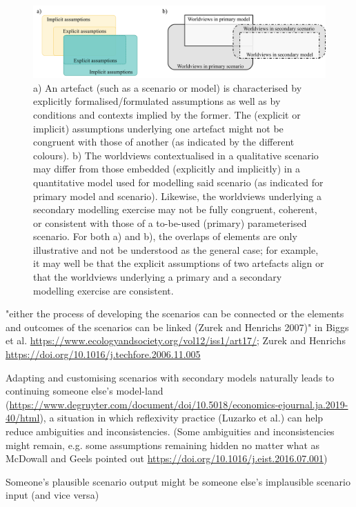 \documentclass{article}
\begin{document}
\begin{refsection}
\begin{figure} [ht]
    \includegraphics[width=\textwidth]{Worldviews.png} 
    \caption[Some caption for list of figures]{a) An artefact (such as a scenario or model) is characterised by explicitly formalised/formulated assumptions as well as by conditions and contexts implied by the former. The (explicit or implicit) assumptions underlying one artefact might not be congruent with those of another (as indicated by the different colours). b) The worldviews contextualised in a qualitative scenario may differ from those embedded (explicitly and implicitly) in a quantitative model used for modelling said scenario (as indicated for primary model and scenario). Likewise, the worldviews underlying a secondary modelling exercise may not be fully congruent, coherent, or consistent with those of a to-be-used (primary) parameterised scenario. For both a) and b), the overlaps of elements are only illustrative and not be understood as the general case; for example, it may well be that the explicit assumptions of two artefacts align or that the worldviews underlying a primary and a secondary modelling exercise are consistent.}  
    \label{fig:worldviews}
\end{figure}

"either the process of developing the scenarios can be connected or the elements and outcomes of the scenarios can be linked (Zurek and Henrichs 2007)" in Biggs et al. \url{https://www.ecologyandsociety.org/vol12/iss1/art17/}; Zurek and Henrichs \url{https://doi.org/10.1016/j.techfore.2006.11.005}

Adapting and customising scenarios with secondary models naturally leads to continuing someone else's model-land (\url{https://www.degruyter.com/document/doi/10.5018/economics-ejournal.ja.2019-40/html}), a situation in which reflexivity practice (Luzarko et al.) can help reduce ambiguities and inconsistencies. (Some ambiguities and inconsistencies might remain, e.g. some assumptions remaining hidden no matter what as McDowall and Geels pointed out \url{https://doi.org/10.1016/j.eist.2016.07.001})

Someone's plausible scenario output might be someone else's implausible scenario input (and vice versa)


\end{refsection}
\end{document}
